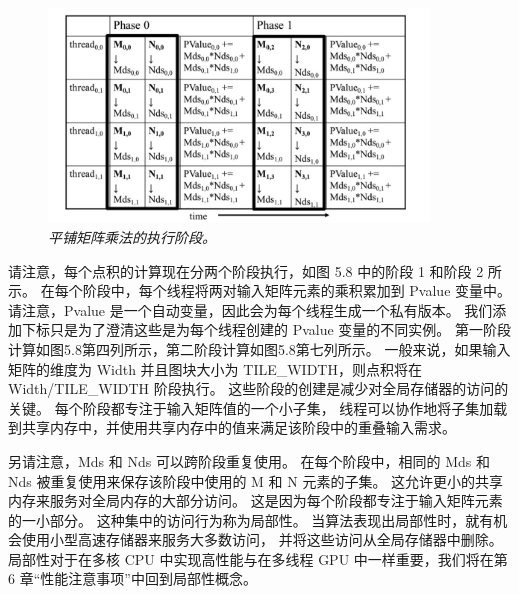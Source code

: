 \begin{figure}[H]
	\centering
	\includegraphics[width=0.9\textwidth]{figs/F5.8.png}
	\caption{\textit{平铺矩阵乘法的执行阶段。}}
\end{figure}

请注意，每个点积的计算现在分两个阶段执行，如图 5.8 中的阶段 1 和阶段 2 所示。 
在每个阶段中，每个线程将两对输入矩阵元素的乘积累加到 Pvalue 变量中。 
请注意，Pvalue 是一个自动变量，因此会为每个线程生成一个私有版本。 
我们添加下标只是为了澄清这些是为每个线程创建的 Pvalue 变量的不同实例。 
第一阶段计算如图5.8第四列所示，第二阶段计算如图5.8第七列所示。 
一般来说，如果输入矩阵的维度为 Width 并且图块大小为 TILE\_WIDTH，则点积将在 Width/TILE\_WIDTH 阶段执行。 
这些阶段的创建是减少对全局存储器的访问的关键。 每个阶段都专注于输入矩阵值的一个小子集，
线程可以协作地将子集加载到共享内存中，并使用共享内存中的值来满足该阶段中的重叠输入需求。

另请注意，Mds 和 Nds 可以跨阶段重复使用。 
在每个阶段中，相同的 Mds 和 Nds 被重复使用来保存该阶段中使用的 M 和 N 元素的子集。 
这允许更小的共享内存来服务对全局内存的大部分访问。 这是因为每个阶段都专注于输入矩阵元素的一小部分。 
这种集中的访问行为称为局部性。 当算法表现出局部性时，就有机会使用小型高速存储器来服务大多数访问，
并将这些访问从全局存储器中删除。 
局部性对于在多核 CPU 中实现高性能与在多线程 GPU 中一样重要，我们将在第 6 章“性能注意事项”中回到局部性概念。

